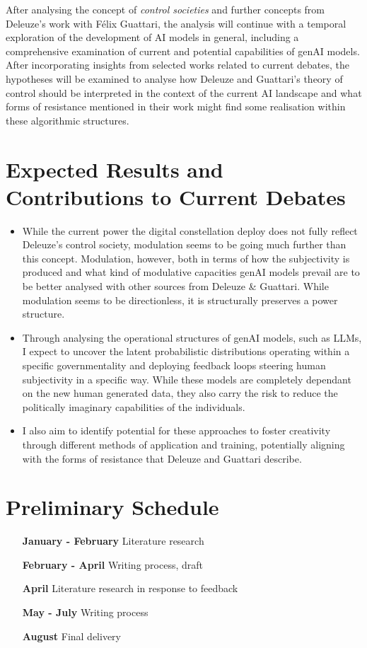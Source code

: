 After analysing the concept of \textit{control societies} and further concepts from Deleuze’s work with Félix Guattari, the analysis will continue with a temporal exploration of the development of AI models in general, including a comprehensive examination of current and potential capabilities of genAI models. After incorporating insights from selected works related to current debates, the hypotheses will be examined to analyse how Deleuze and Guattari’s theory of control should be interpreted in the context of the current AI landscape and what forms of resistance mentioned in their work might find some realisation within these algorithmic structures.


\section{Expected Results and Contributions to Current Debates}

\begin{itemize}
	\item While the current power the digital constellation deploy does not fully reflect Deleuze's control society, modulation seems to be going much further than this concept. Modulation, however, both in terms of how the subjectivity is produced and what kind of modulative capacities genAI models prevail are to be better analysed with other sources from Deleuze \& Guattari. While modulation seems to be directionless, it is structurally preserves a power structure.
	\item Through analysing the operational structures of genAI models, such as LLMs, I expect to uncover the latent probabilistic distributions operating within a specific governmentality and deploying feedback loops steering human subjectivity in a specific way. While these models are completely dependant on the new human generated data, they also carry the risk to reduce the politically imaginary capabilities of the individuals.
	\item  I also aim to identify potential for these approaches to foster creativity through different methods of application and training, potentially aligning with the forms of resistance that Deleuze and Guattari describe.
\end{itemize}

\section{Preliminary Schedule}
\begin{itemize}
	\item [\textbf{January - February}] Literature research
	\item [\textbf{February - April}] Writing process, draft
	\item [\textbf{April}] Literature research in response to feedback
	\item [\textbf{May - July}] Writing process
	\item [\textbf{August}] Final delivery
\end{itemize}


